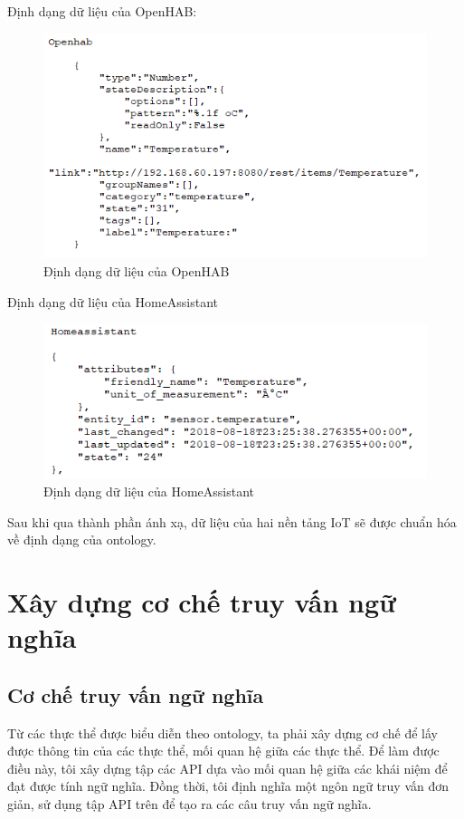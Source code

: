 Định dạng dữ liệu của OpenHAB:

\begin{figure}[h!]
	\center
	\includegraphics[scale=0.6]{image/openhab_dataformat}
	\caption{Định dạng dữ liệu của OpenHAB}
\end{figure}

Định dạng dữ liệu của HomeAssistant
\clearpage
\begin{figure}[h!]
	\center
	\includegraphics[scale=0.6]{image/homeassistant_dataformat}
	\caption{Định dạng dữ liệu của HomeAssistant}
\end{figure}

Sau khi qua thành phần ánh xạ, dữ liệu của hai nền tảng IoT sẽ được chuẩn hóa về định dạng của ontology.

\section{Xây dựng cơ chế truy vấn ngữ nghĩa}

\subsection{Cơ chế truy vấn ngữ nghĩa}
Từ các thực thể được biểu diễn theo ontology, ta phải xây dựng cơ chế để lấy được thông tin của các thực thể, mối quan hệ giữa các thực thể. Để làm được điều này, tôi xây dựng tập các API dựa vào mối quan hệ giữa các khái niệm để đạt được tính ngữ nghĩa. Đồng thời, tôi định nghĩa một ngôn ngữ truy vấn đơn giản, sử dụng tập API trên để tạo ra các câu truy vấn ngữ nghĩa.

